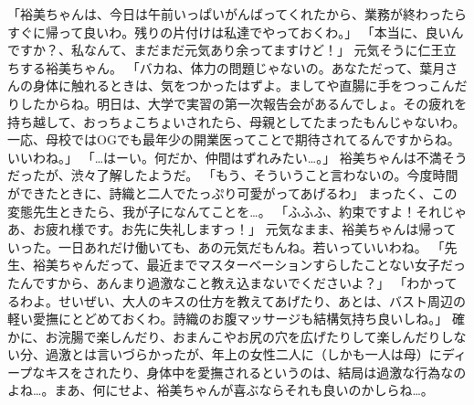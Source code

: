 「裕美ちゃんは、今日は午前いっぱいがんばってくれたから、業務が終わったらすぐに帰って良いわ。残りの片付けは私達でやっておくわ。」
「本当に、良いんですか？、私なんて、まだまだ元気あり余ってますけど！」
元気そうに仁王立ちする裕美ちゃん。
「バカね、体力の問題じゃないの。あなただって、葉月さんの身体に触れるときは、気をつかったはずよ。ましてや直腸に手をつっこんだりしたからね。明日は、大学で実習の第一次報告会があるんでしょ。その疲れを持ち越して、おっちょこちょいされたら、母親としてたまったもんじゃないわ。一応、母校ではOGでも最年少の開業医ってことで期待されてるんですからね。いいわね。」
「…はーい。何だか、仲間はずれみたい…。」
裕美ちゃんは不満そうだったが、渋々了解したようだ。
「もう、そういうこと言わないの。今度時間ができたときに、詩織と二人でたっぷり可愛がってあげるわ」
まったく、この変態先生ときたら、我が子になんてことを…。
「ふふふ、約束ですよ！それじゃあ、お疲れ様です。お先に失礼しますっ！」
元気なまま、裕美ちゃんは帰っていった。一日あれだけ働いても、あの元気だもんね。若いっていいわね。
「先生、裕美ちゃんだって、最近までマスターベーションすらしたことない女子だったんですから、あんまり過激なこと教え込まないでくださいよ？」
「わかってるわよ。せいぜい、大人のキスの仕方を教えてあげたり、あとは、バスト周辺の軽い愛撫にとどめておくわ。詩織のお腹マッサージも結構気持ち良いしね。」
確かに、お浣腸で楽しんだり、おまんこやお尻の穴を広げたりして楽しんだりしない分、過激とは言いづらかったが、年上の女性二人に（しかも一人は母）にディープなキスをされたり、身体中を愛撫されるというのは、結局は過激な行為なのよね…。まあ、何にせよ、裕美ちゃんが喜ぶならそれも良いのかしらね…。

